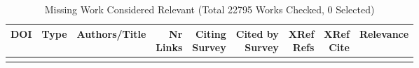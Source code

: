 {\scriptsize
\begin{longtable}{p{5cm}lp{11cm}rrrrrr}
\caption{Missing Work Considered Relevant (Total 22795 Works Checked, 0 Selected)}\\ \toprule
DOI & Type & Authors/Title & \shortstack{Nr\\Links} & \shortstack{Citing\\Survey} & \shortstack{Cited by\\Survey} & \shortstack{XRef\\Refs} & \shortstack{XRef\\Cite} & Relevance\\ \midrule\endhead
\bottomrule
\endfoot
\end{longtable}
}


